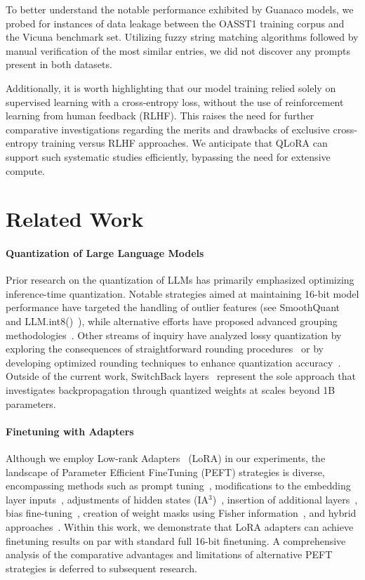 To better understand the notable performance exhibited by {Guanaco} models, we probed for instances of data leakage between the OASST1 training corpus and the Vicuna benchmark set. Utilizing fuzzy string matching algorithms followed by manual verification of the most similar entries, we did not discover any prompts present in both datasets.

Additionally, it is worth highlighting that our model training relied solely on supervised learning with a cross-entropy loss, without the use of reinforcement learning from human feedback (RLHF). This raises the need for further comparative investigations regarding the merits and drawbacks of exclusive cross-entropy training versus RLHF approaches. We anticipate that \textsc{QLoRA} can support such systematic studies efficiently, bypassing the need for extensive compute.

\section{Related Work}

\paragraph{Quantization of Large Language Models} Prior research on the quantization of LLMs has primarily emphasized optimizing inference-time quantization. Notable strategies aimed at maintaining 16-bit model performance have targeted the handling of outlier features (see SmoothQuant~\citep{xiao2022smoothquant} and LLM.int8()~\citep{dettmers2022llm}), while alternative efforts have proposed advanced grouping methodologies~\citep{park2022nuqmm, yao2022zeroquant}. Other streams of inquiry have analyzed lossy quantization by exploring the consequences of straightforward rounding procedures~\citep{dettmers2022case,zeng2022glm,pope2022efficiently} or by developing optimized rounding techniques to enhance quantization accuracy~\citep{frantar2022gptq}. Outside of the current work, SwitchBack layers~\citep{wortsman2023stable} represent the sole approach that investigates backpropagation through quantized weights at scales beyond 1B parameters.

\paragraph{Finetuning with Adapters} Although we employ Low-rank Adapters~\citep{hu2021lora} (LoRA) in our experiments, the landscape of Parameter Efficient FineTuning (PEFT) strategies is diverse, encompassing methods such as prompt tuning~\citep{qin2021learning,lester2021power,li2021prefix}, modifications to the embedding layer inputs~\citep{an2022input}, adjustments of hidden states (IA$^3$)~\citep{liu2022few}, insertion of additional layers~\citep{houlsby2019parameter}, bias fine-tuning~\citep{zaken2021bitfit}, creation of weight masks using Fisher information~\citep{sung2021training}, and hybrid approaches~\citep{henderson2021compacter}. Within this work, we demonstrate that LoRA adapters can achieve finetuning results on par with standard full 16-bit finetuning. A comprehensive analysis of the comparative advantages and limitations of alternative PEFT strategies is deferred to subsequent research.

